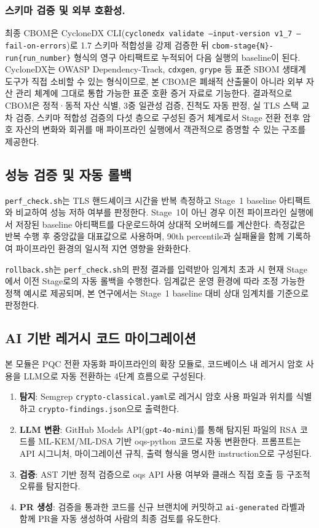 \subsubsection{스키마 검증 및 외부 호환성.}

최종 CBOM은 CycloneDX CLI(\texttt{cyclonedx validate --input-version v1\_7 --fail-on-errors})로 1.7 스키마 적합성을 강제 검증한 뒤 \texttt{cbom-stage\{N\}-run\{run\_number\}} 형식의 영구 아티팩트로 누적되어 다음 실행의 baseline이 된다.
CycloneDX는 OWASP Dependency-Track, \texttt{cdxgen}, \texttt{grype} 등 표준 SBOM 생태계 도구가 직접 소비할 수 있는 형식이므로, 본 CBOM은 폐쇄적 산출물이 아니라 외부 자산 관리 체계에 그대로 통합 가능한 표준 호환 증거 자료로 기능한다.
결과적으로 CBOM은 정적·동적 자산 식별, 3중 일관성 검증, 진척도 자동 판정, 실 TLS 스택 교차 검증, 스키마 적합성 검증의 다섯 층으로 구성된 증거 체계로서 Stage 전환 전후 암호 자산의 변화와 회귀를 매 파이프라인 실행에서 객관적으로 증명할 수 있는 구조를 제공한다.

\subsection{성능 검증 및 자동 롤백}

\texttt{perf\_check.sh}는 TLS 핸드셰이크 시간을 반복 측정하고 Stage~1 baseline 아티팩트와 비교하여 성능 저하 여부를 판정한다.
Stage~1이 아닌 경우 이전 파이프라인 실행에서 저장된 baseline 아티팩트를 다운로드하여 상대적 오버헤드를 계산한다.
측정값은 반복 수행 후 중앙값을 대표값으로 사용하며, 90th percentile과 실패율을 함께 기록하여 파이프라인 환경의 일시적 지연 영향을 완화한다.

\texttt{rollback.sh}는 \texttt{perf\_check.sh}의 판정 결과를 입력받아 임계치 초과 시 현재 Stage에서 이전 Stage로의 자동 롤백을 수행한다.
임계값은 운영 환경에 따라 조정 가능한 정책 예시로 제공되며, 본 연구에서는 Stage~1 baseline 대비 상대 임계치를 기준으로 판정한다.

\subsection{AI 기반 레거시 코드 마이그레이션}

본 모듈은 PQC 전환 자동화 파이프라인의 확장 모듈로, 코드베이스 내 레거시 암호 사용을 LLM으로 자동 전환하는 4단계 흐름으로 구성된다.

\begin{enumerate}[itemsep=2pt]
  \item \textbf{탐지}: Semgrep \texttt{crypto-classical.yaml}로 레거시 암호 사용 파일과 위치를 식별하고 \texttt{crypto-findings.json}으로 출력한다.
  \item \textbf{LLM 변환}: GitHub Models API(\texttt{gpt-4o-mini})를 통해 탐지된 파일의 RSA 코드를 ML-KEM/ML-DSA 기반 oqs-python 코드로 자동 변환한다. 프롬프트는 API 시그니처, 마이그레이션 규칙, 출력 형식을 명시한 instruction으로 구성된다.
  \item \textbf{검증}: AST 기반 정적 검증으로 oqs API 사용 여부와 클래스 직접 호출 등 구조적 오류를 탐지한다.
  \item \textbf{PR 생성}: 검증을 통과한 코드를 신규 브랜치에 커밋하고 \texttt{ai-generated} 라벨과 함께 PR을 자동 생성하여 사람의 최종 검토를 유도한다.
\end{enumerate}

